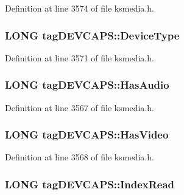 Definition at line 3574 of file ksmedia.\+h.

\subsubsection[{\texorpdfstring{Device\+Type}{DeviceType}}]{\setlength{\rightskip}{0pt plus 5cm}L\+O\+NG tag\+D\+E\+V\+C\+A\+P\+S\+::\+Device\+Type}\hypertarget{structtag_d_e_v_c_a_p_s_a9c4e6122f960b8863ef63679af062dbf}{}\label{structtag_d_e_v_c_a_p_s_a9c4e6122f960b8863ef63679af062dbf}


Definition at line 3571 of file ksmedia.\+h.

\subsubsection[{\texorpdfstring{Has\+Audio}{HasAudio}}]{\setlength{\rightskip}{0pt plus 5cm}L\+O\+NG tag\+D\+E\+V\+C\+A\+P\+S\+::\+Has\+Audio}\hypertarget{structtag_d_e_v_c_a_p_s_ab30bc5bc2636659f82048cb169f365a7}{}\label{structtag_d_e_v_c_a_p_s_ab30bc5bc2636659f82048cb169f365a7}


Definition at line 3567 of file ksmedia.\+h.

\subsubsection[{\texorpdfstring{Has\+Video}{HasVideo}}]{\setlength{\rightskip}{0pt plus 5cm}L\+O\+NG tag\+D\+E\+V\+C\+A\+P\+S\+::\+Has\+Video}\hypertarget{structtag_d_e_v_c_a_p_s_ab8090f42c74b210fbf55f522dba7e48e}{}\label{structtag_d_e_v_c_a_p_s_ab8090f42c74b210fbf55f522dba7e48e}


Definition at line 3568 of file ksmedia.\+h.

\subsubsection[{\texorpdfstring{Index\+Read}{IndexRead}}]{\setlength{\rightskip}{0pt plus 5cm}L\+O\+NG tag\+D\+E\+V\+C\+A\+P\+S\+::\+Index\+Read}\hypertarget{structtag_d_e_v_c_a_p_s_a9509fe673cf1f9919d9e302d44d48be0}{}\label{structtag_d_e_v_c_a_p_s_a9509fe673cf1f9919d9e302d44d48be0}


